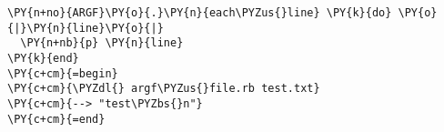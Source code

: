 \begin{Verbatim}[commandchars=\\\{\}]
\PY{n+no}{ARGF}\PY{o}{.}\PY{n}{each\PYZus{}line} \PY{k}{do} \PY{o}{|}\PY{n}{line}\PY{o}{|}
  \PY{n+nb}{p} \PY{n}{line}
\PY{k}{end}
\PY{c+cm}{=begin}
\PY{c+cm}{\PYZdl{} argf\PYZus{}file.rb test.txt}
\PY{c+cm}{--> "test\PYZbs{}n"}
\PY{c+cm}{=end}
\end{Verbatim}
